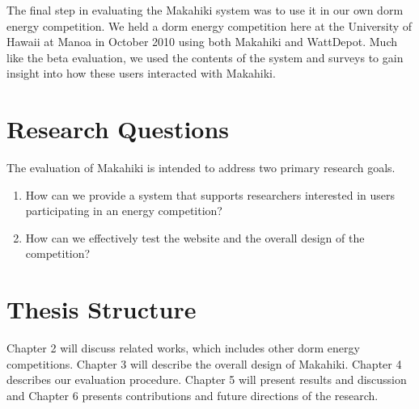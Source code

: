 The final step in evaluating the Makahiki system was to use it in our own dorm energy competition. We held a dorm energy competition here at the University of Hawaii at Manoa in October 2010 using both Makahiki and WattDepot.  Much like the beta evaluation, we used the contents of the system and surveys to gain insight into how these users interacted with Makahiki.

\section{Research Questions}

The evaluation of Makahiki is intended to address two primary research goals.

\begin{enumerate}
  \item How can we provide a system that supports researchers interested in users participating in an energy competition?
	\item How can we effectively test the website and the overall design of the competition?
\end{enumerate}

\section{Thesis Structure}

Chapter 2 will discuss related works, which includes other dorm energy competitions.  Chapter 3 will describe the overall design of Makahiki.  Chapter 4 describes our evaluation procedure.  Chapter 5 will present results and discussion and Chapter 6 presents contributions and future directions of the research.